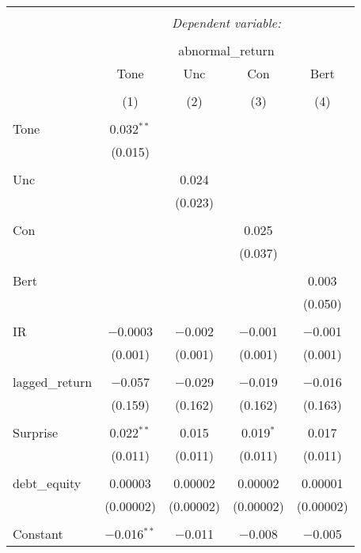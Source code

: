 \documentclass[
]{article}
\begin{document}
\begin{table}[!htbp] \centering 
  \caption{} 
  \label{} 
\begin{tabular}{@{\extracolsep{5pt}}lcccc} 
\\[-1.8ex]\hline 
\hline \\[-1.8ex] 
 & \multicolumn{4}{c}{\textit{Dependent variable:}} \\ 
\cline{2-5} 
\\[-1.8ex] & \multicolumn{4}{c}{abnormal\_return} \\ 
 & Tone & Unc & Con & Bert \\ 
\\[-1.8ex] & (1) & (2) & (3) & (4)\\ 
\hline \\[-1.8ex] 
 Tone & 0.032$^{**}$ &  &  &  \\ 
  & (0.015) &  &  &  \\ 
  & & & & \\ 
 Unc &  & 0.024 &  &  \\ 
  &  & (0.023) &  &  \\ 
  & & & & \\ 
 Con &  &  & 0.025 &  \\ 
  &  &  & (0.037) &  \\ 
  & & & & \\ 
 Bert &  &  &  & 0.003 \\ 
  &  &  &  & (0.050) \\ 
  & & & & \\ 
 IR & $-$0.0003 & $-$0.002 & $-$0.001 & $-$0.001 \\ 
  & (0.001) & (0.001) & (0.001) & (0.001) \\ 
  & & & & \\ 
 lagged\_return & $-$0.057 & $-$0.029 & $-$0.019 & $-$0.016 \\ 
  & (0.159) & (0.162) & (0.162) & (0.163) \\ 
  & & & & \\ 
 Surprise & 0.022$^{**}$ & 0.015 & 0.019$^{*}$ & 0.017 \\ 
  & (0.011) & (0.011) & (0.011) & (0.011) \\ 
  & & & & \\ 
 debt\_equity & 0.00003 & 0.00002 & 0.00002 & 0.00001 \\ 
  & (0.00002) & (0.00002) & (0.00002) & (0.00002) \\ 
  & & & & \\ 
 Constant & $-$0.016$^{**}$ & $-$0.011 & $-$0.008 & $-$0.005 \\ 

\end{tabular}
\end{table}
\end{document}
